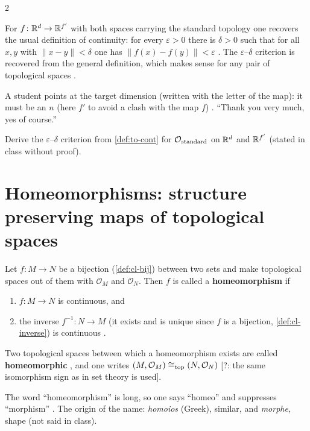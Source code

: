 \begin{paracol}{2}
\begin{example}\label{ex:to-cont-eps}
For $f\colon\mathbb{R}^d\to\mathbb{R}^{f'}$ with both spaces carrying the standard topology one recovers the usual definition of continuity: for
every $\varepsilon>0$ there is $\delta>0$ such that for all $x,y$ with $\|x-y\|<\delta$ one has $\|f(x)-f(y)\|<\varepsilon$ . The
$\varepsilon$--$\delta$ criterion is recovered from the general definition, which makes sense for any pair of topological spaces
.
\end{example}
\begin{coursenote}
A student points at the target dimension (written with the letter of the map): it must be an $n$ (here $f'$ to avoid a clash with the map $f$)
. ``Thank you very much, yes of course.''
\end{coursenote}
\begin{exercise}[$\varepsilon$--$\delta$]\label{ex:to-cont-eps-proof}
Derive the $\varepsilon$--$\delta$ criterion from \cref{def:to-cont} for $\mathcal O_{\rm standard}$ on $\mathbb{R}^d$ and $\mathbb{R}^{f'}$ (stated in
class without proof).
\end{exercise}

\section{Homeomorphisms: structure preserving maps of topological spaces}\label{sec:to-homeo}

\begin{definition}\label{def:to-homeo}
Let $f\colon M\to N$ be a bijection (\cref{def:cl-bij}) between two sets and make topological spaces out of them with $\mathcal O_M$ and
$\mathcal O_N$. Then $f$ is called a \textbf{homeomorphism} if 
\begin{enumerate}
  \item $f\colon M\to N$ is continuous, and
  \item the inverse $f^{-1}\colon N\to M$ (it exists and is unique since $f$ is a bijection, \cref{def:cl-inverse}) is continuous
        .
\end{enumerate}
Two topological spaces between which a homeomorphism exists are called \textbf{homeomorphic} , and one writes
$(M,\mathcal O_M)\cong_{\rm top}(N,\mathcal O_N)$ [?: the same isomorphism sign as in set theory is used].
\end{definition}
The word ``homeomorphism'' is long, so one says ``homeo'' and suppresses ``morphism'' . The origin of the name:
\emph{homoios} (Greek), similar, and \emph{morphe}, shape (not said in class).


\end{paracol}
